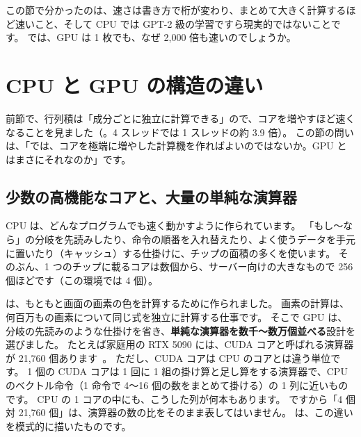 この節で分かったのは、速さは書き方で桁が変わり、まとめて大きく計算するほど速いこと、そして CPU では GPT-2 級の学習ですら現実的ではないことです。
では、GPU は 1 枚でも、なぜ 2,000 倍も速いのでしょうか。

\section{CPU と GPU の構造の違い}\label{sec:gpu-arch}

前節で、行列積は「成分ごとに独立に計算できる」ので、コアを増やすほど速くなることを見ました（。4 スレッドでは 1 スレッドの約 3.9 倍）。
この節の問いは、「では、コアを極端に増やした計算機を作ればよいのではないか。GPU とはまさにそれなのか」です。

\subsection*{少数の高機能なコアと、大量の単純な演算器}

CPU は、どんなプログラムでも速く動かすように作られています。
「もし〜なら」の分岐を先読みしたり、命令の順番を入れ替えたり、よく使うデータを手元に置いたり（キャッシュ）する仕掛けに、チップの面積の多くを使います。
そのぶん、1 つのチップに載るコアは数個から、サーバー向けの大きなもので 256 個ほどです（この環境では 4 個）。

は、もともと画面の画素の色を計算するために作られました。
画素の計算は、何百万もの画素について同じ式を独立に計算する仕事です。
そこで GPU は、分岐の先読みのような仕掛けを省き、\textbf{単純な演算器を数千〜数万個並べる}設計を選びました。
たとえば家庭用の RTX 5090 には、CUDA コアと呼ばれる演算器が 21,760 個あります~\cite{nvidia2026rtx5090}。
ただし、CUDA コアは CPU のコアとは違う単位です。
1 個の CUDA コアは 1 回に 1 組の掛け算と足し算をする演算器で、CPU のベクトル命令（1 命令で 4〜16 個の数をまとめて掛ける）の 1 列に近いものです。
CPU の 1 コアの中にも、こうした列が何本もあります。
ですから「4 個対 21,760 個」は、演算器の数の比をそのまま表してはいません。
は、この違いを模式的に描いたものです。

